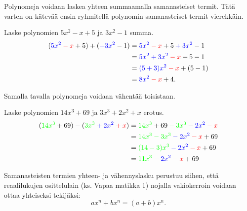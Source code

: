 
Polynomeja voidaan laskea yhteen summaamalla samanasteiset termit. Tätä varten on kätevää ensin ryhmitellä polynomin samanasteiset termit vierekkäin.

\begin{esimerkki}
Laske polynomien $5x^2-x+5$ ja $3x^2-1$ summa.
   \begin{align*}
        (\textcolor{blue}{5x^2} \textcolor{red}{{}-x} + 5) + (\textcolor{blue}{+3x^2} -1) 
        &=\textcolor{blue}{5x^2} \textcolor{red}{{}-x} + 5  \textcolor{blue}{{}+3x^2} -1 \\
        &=\textcolor{blue}{5x^2+3x^2} \textcolor{red}{{}-x} +5-1\\
        &=\textcolor{blue}{(5+3)x^2} \textcolor{red}{{}-x}+(5-1)\\
        &=\textcolor{blue}{8x^2} \textcolor{red}{{}-x}+4.
    \end{align*}
\end{esimerkki}

Samalla tavalla polynomeja voidaan vähentää toisistaan.

\begin{esimerkki}
    Laske polynomien $14x^3+69$ ja $3x^3+2x^2+x$ erotus.
    \begin{align*}
        (\textcolor{green}{14x^3} + 69) - (\textcolor{green}{3x^3} \textcolor{blue}{{}+ 2x^2} \textcolor{red}{{}+x})
        &= \textcolor{green}{14x^3} + 69 \textcolor{green}{{}-3x^3} - 
            \textcolor{blue}{2x^2} \textcolor{red}{{}-x} \\
        &= \textcolor{green}{14x^3{}-3x^3} \textcolor{blue}{{}-2x^2} \textcolor{red}{{}-x} + 69 \\
        &= \textcolor{green}{(14{}-3)x^3} \textcolor{blue}{{}-2x^2} \textcolor{red}{{}-x} + 69 \\
        &= \textcolor{green}{11x^3} \textcolor{blue}{{}-2x^2} \textcolor{red}{{}-x} + 69
    \end{align*}
\end{esimerkki}
    
Samanasteisten termien yhteen- ja vähennyslasku perustuu siihen, että reaalilukujen osittelulain (ks. Vapaa matikka 1) nojalla vakiokerroin voidaan
ottaa yhteiseksi tekijäksi:
\[
ax^n+bx^n=(a+b)x^n.
\]

